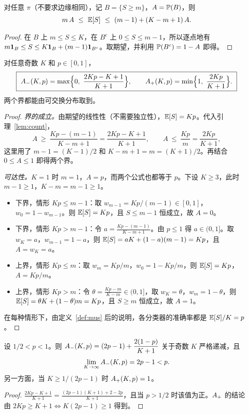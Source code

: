 \documentclass[11pt]{article}
\begin{document}
\begin{lemma}[数票不等式]\label{lem:count}
对任意 $\pi$（不要求边缘相同），记 $B=\{S\ge m\}$，$A=\mathbb{P}(B)$，则
\[
m\,A\ \le\ \mathbb{E}[S]\ \le\ (m-1)+(K-m+1)\,A .
\]
\end{lemma}
\begin{proof}
在 $B$ 上 $m\le S\le K$，在 $B^c$ 上 $0\le S\le m-1$，所以逐点地有 $m\mathbf{1}_B\le S\le K\mathbf{1}_B+(m-1)\mathbf{1}_{B^c}$。取期望，并利用 $\mathbb{P}(B^c)=1-A$ 即得。
\end{proof}

\begin{theorem}[相同准确率的紧确界]\label{thm:equal}
对任意奇数 $K$ 和 $p\in[0,1]$，
\[
\boxed{\ \Amin(K,p)=\max\Bigl\{0,\ \frac{2Kp-K+1}{K+1}\Bigr\},\qquad \Aplus(K,p)=\min\Bigl\{1,\ \frac{2Kp}{K+1}\Bigr\}.\ }
\]
两个界都能由可交换分布取到。
\end{theorem}

\begin{proof}
\emph{界的成立。}由期望的线性性（不需要独立性），$\mathbb{E}[S]=Kp$。代入引理~\ref{lem:count}，
\[
A\ \ge\ \frac{Kp-(m-1)}{K-m+1}=\frac{2Kp-K+1}{K+1},\qquad A\ \le\ \frac{Kp}{m}=\frac{2Kp}{K+1},
\]
这里用了 $m-1=(K-1)/2$ 和 $K-m+1=m=(K+1)/2$。再结合 $0\le A\le1$ 即得两个界。

\emph{可达性。}$K=1$ 时 $m=1$，$A=p$，而两个公式也都等于 $p$。下设 $K\ge3$，此时 $m-1\ge1$，$K-m=m-1\ge1$。
\begin{itemize}
\item 下界，情形 $Kp\le m-1$：取 $w_{m-1}=Kp/(m-1)\in[0,1]$，$w_0=1-w_{m-1}$。则 $\mathbb{E}[S]=Kp$，且 $S\le m-1$ 恒成立，故 $A=0$。
\item 下界，情形 $Kp>m-1$：令 $a=\frac{Kp-(m-1)}{K-m+1}$。由 $p\le1$ 得 $a\in(0,1]$。取 $w_K=a$，$w_{m-1}=1-a$，则 $\mathbb{E}[S]=aK+(1-a)(m-1)=Kp$，且 $A=w_K=a$。
\item 上界，情形 $Kp\le m$：取 $w_m=Kp/m$，$w_0=1-Kp/m$，则 $\mathbb{E}[S]=Kp$，$A=Kp/m$。
\item 上界，情形 $Kp>m$：令 $\theta=\frac{Kp-m}{K-m}\in(0,1]$，取 $w_K=\theta$，$w_m=1-\theta$，则 $\mathbb{E}[S]=\theta K+(1-\theta)m=Kp$，且 $S\ge m$ 恒成立，故 $A=1$。
\end{itemize}
在每种情形下，由定义~\ref{def:mus} 后的说明，各分类器的准确率都是 $\mathbb{E}[S]/K=p$。
\end{proof}

\begin{corollary}\label{cor:Kdecrease}
设 $1/2<p<1$。则 $A_{-}(K,p)=(2p-1)+\dfrac{2(1-p)}{K+1}$ 关于奇数 $K$ 严格递减，且
\[
\lim_{K\to\infty}A_{-}(K,p)=2p-1<p .
\]
另一方面，当 $K\ge 1/(2p-1)$ 时 $A_{+}(K,p)=1$。
\end{corollary}
\begin{proof}
$\frac{2Kp-K+1}{K+1}=\frac{(2p-1)(K+1)+2-2p}{K+1}$，且当 $p>1/2$ 时该值为正。$A_{+}$ 的结论由 $2Kp\ge K+1\iff K(2p-1)\ge1$ 得到。
\end{proof}
\end{document}
